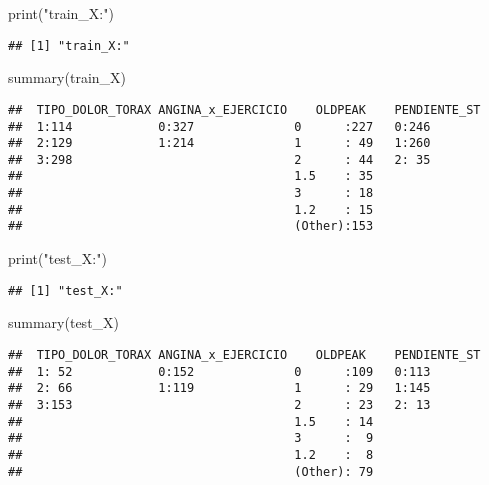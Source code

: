 \documentclass[
]{article}
\newenvironment{Shaded}{\begin{snugshade}}{\end{snugshade}}
\newcommand{\FunctionTok}[1]{\textcolor[rgb]{0.94,0.94,0.56}{#1}}
\newcommand{\NormalTok}[1]{\textcolor[rgb]{0.80,0.80,0.80}{#1}}
\newcommand{\StringTok}[1]{\textcolor[rgb]{0.80,0.58,0.58}{#1}}
\begin{document}
\begin{Shaded}
\begin{Highlighting}[]
\FunctionTok{print}\NormalTok{(}\StringTok{"train\_X:"}\NormalTok{)}
\end{Highlighting}
\end{Shaded}

\begin{verbatim}
## [1] "train_X:"
\end{verbatim}

\begin{Shaded}
\begin{Highlighting}[]
\FunctionTok{summary}\NormalTok{(train\_X)}
\end{Highlighting}
\end{Shaded}

\begin{verbatim}
##  TIPO_DOLOR_TORAX ANGINA_x_EJERCICIO    OLDPEAK    PENDIENTE_ST
##  1:114            0:327              0      :227   0:246       
##  2:129            1:214              1      : 49   1:260       
##  3:298                               2      : 44   2: 35       
##                                      1.5    : 35               
##                                      3      : 18               
##                                      1.2    : 15               
##                                      (Other):153
\end{verbatim}

\begin{Shaded}
\begin{Highlighting}[]
\FunctionTok{print}\NormalTok{(}\StringTok{"test\_X:"}\NormalTok{)}
\end{Highlighting}
\end{Shaded}

\begin{verbatim}
## [1] "test_X:"
\end{verbatim}

\begin{Shaded}
\begin{Highlighting}[]
\FunctionTok{summary}\NormalTok{(test\_X)}
\end{Highlighting}
\end{Shaded}

\begin{verbatim}
##  TIPO_DOLOR_TORAX ANGINA_x_EJERCICIO    OLDPEAK    PENDIENTE_ST
##  1: 52            0:152              0      :109   0:113       
##  2: 66            1:119              1      : 29   1:145       
##  3:153                               2      : 23   2: 13       
##                                      1.5    : 14               
##                                      3      :  9               
##                                      1.2    :  8               
##                                      (Other): 79
\end{verbatim}
\end{document}
